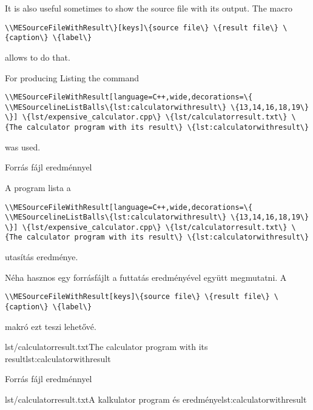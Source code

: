 {
It is also useful sometimes to show the source file with its output.
The macro 
\par\noindent\lstinline|\\MESourceFileWithResult\}[keys]\{source file\} \{result file\} \{caption\} \{label\}|
\par\noindent allows to do that. 

 For producing Listing \ao{\ref{lst:calculatorwithresult}}
the command 
\par\noindent\lstinline|\\MESourceFileWithResult[language=C++,wide,decorations=\{
	\\MESourcelineListBalls\{lst:calculatorwithresult\} \{13,14,16,18,19\}
\}] \{lst/expensive_calculator.cpp\}
\{lst/calculatorresult.txt\} \{The calculator program with its result\} \{lst:calculatorwithresult\}|
\par\noindent was used.
}
{Forrás fájl eredménnyel}
{
A \ao{\ref{lst:calculatorwithresult}} program lista
a 
\par\noindent\lstinline|\\MESourceFileWithResult[language=C++,wide,decorations=\{
	\\MESourcelineListBalls\{lst:calculatorwithresult\} \{13,14,16,18,19\}
\}] \{lst/expensive_calculator.cpp\}
\{lst/calculatorresult.txt\} \{The calculator program with its result\} \{lst:calculatorwithresult\}|
\par\noindent utasítás eredménye.

Néha hasznos egy forrásfájlt a futtatás eredményével együtt megmutatni.
A
\par\noindent\lstinline|\\MESourceFileWithResult[keys]\{source file\} \{result file\} \{caption\} \{label\}|
\par\noindent makró ezt teszi lehetővé.

}
{

{lst/calculatorresult.txt}{The calculator program with its result}{lst:calculatorwithresult}


}
{Forrás fájl eredménnyel}
{

{lst/calculatorresult.txt}{A kalkulator program és eredménye}{lst:calculatorwithresult}
}

